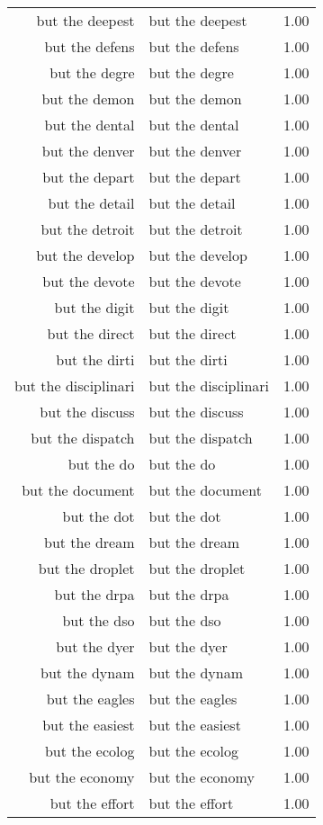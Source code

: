 \begin{table}[ht]
\begin{tabular}{rlr}
  but the deepest & but the deepest & 1.00 \\ 
  but the defens & but the defens & 1.00 \\ 
  but the degre & but the degre & 1.00 \\ 
  but the demon & but the demon & 1.00 \\ 
  but the dental & but the dental & 1.00 \\ 
  but the denver & but the denver & 1.00 \\ 
  but the depart & but the depart & 1.00 \\ 
  but the detail & but the detail & 1.00 \\ 
  but the detroit & but the detroit & 1.00 \\ 
  but the develop & but the develop & 1.00 \\ 
  but the devote & but the devote & 1.00 \\ 
  but the digit & but the digit & 1.00 \\ 
  but the direct & but the direct & 1.00 \\ 
  but the dirti & but the dirti & 1.00 \\ 
  but the disciplinari & but the disciplinari & 1.00 \\ 
  but the discuss & but the discuss & 1.00 \\ 
  but the dispatch & but the dispatch & 1.00 \\ 
  but the do & but the do & 1.00 \\ 
  but the document & but the document & 1.00 \\ 
  but the dot & but the dot & 1.00 \\ 
  but the dream & but the dream & 1.00 \\ 
  but the droplet & but the droplet & 1.00 \\ 
  but the drpa & but the drpa & 1.00 \\ 
  but the dso & but the dso & 1.00 \\ 
  but the dyer & but the dyer & 1.00 \\ 
  but the dynam & but the dynam & 1.00 \\ 
  but the eagles & but the eagles & 1.00 \\ 
  but the easiest & but the easiest & 1.00 \\ 
  but the ecolog & but the ecolog & 1.00 \\ 
  but the economy & but the economy & 1.00 \\ 
  but the effort & but the effort & 1.00 \\ 

\end{tabular}
\end{table}
